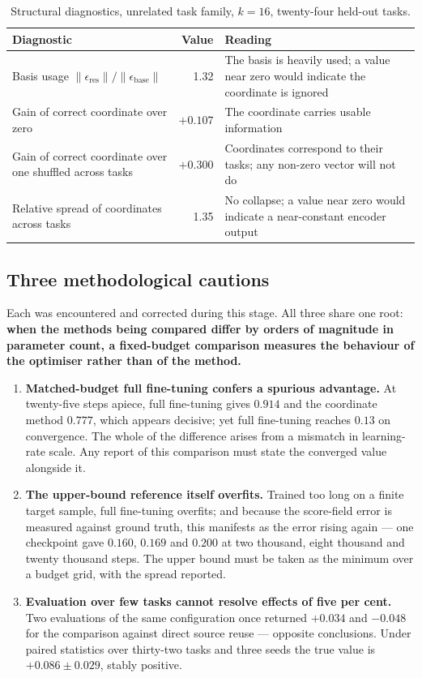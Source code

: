 \documentclass[11pt]{article}
\begin{document}
\begin{table}[htbp]
\centering\small
\begin{tabular}{@{}p{6.4cm}rp{6.0cm}@{}}
\toprule
\textbf{Diagnostic} & \textbf{Value} & \textbf{Reading} \\
\midrule
Basis usage $\|\epsilon_{\mathrm{res}}\|/\|\epsilon_{\mathrm{base}}\|$ & 1.32
  & The basis is heavily used; a value near zero would indicate the coordinate is ignored \\
Gain of correct coordinate over zero & $+0.107$ & The coordinate carries usable information \\
Gain of correct coordinate over one shuffled across tasks & $+0.300$
  & Coordinates correspond to their tasks; any non-zero vector will not do \\
Relative spread of coordinates across tasks & 1.35
  & No collapse; a value near zero would indicate a near-constant encoder output \\
\bottomrule
\end{tabular}
\caption{Structural diagnostics, unrelated task family, $k=16$, twenty-four held-out tasks.}
\label{tab:diag}
\end{table}

\subsection{Three methodological cautions}

Each was encountered and corrected during this stage. All three share one root: \textbf{when the
methods being compared differ by orders of magnitude in parameter count, a fixed-budget comparison
measures the behaviour of the optimiser rather than of the method.}

\begin{enumerate}[leftmargin=2.2em, itemsep=4pt]
\item \textbf{Matched-budget full fine-tuning confers a spurious advantage.} At twenty-five steps
apiece, full fine-tuning gives $0.914$ and the coordinate method $0.777$, which appears decisive;
yet full fine-tuning reaches $0.13$ on convergence. The whole of the difference arises from a
mismatch in learning-rate scale. Any report of this comparison must state the converged value
alongside it.

\item \textbf{The upper-bound reference itself overfits.} Trained too long on a finite target sample,
full fine-tuning overfits; and because the score-field error is measured against ground truth, this
manifests as the error rising again --- one checkpoint gave $0.160$, $0.169$ and $0.200$ at two
thousand, eight thousand and twenty thousand steps. The upper bound must be taken as the minimum
over a budget grid, with the spread reported.

\item \textbf{Evaluation over few tasks cannot resolve effects of five per cent.} Two evaluations of
the same configuration once returned $+0.034$ and $-0.048$ for the comparison against direct source
reuse --- opposite conclusions. Under paired statistics over thirty-two tasks and three seeds the
true value is $+0.086\pm0.029$, stably positive.
\end{enumerate}
\end{document}
